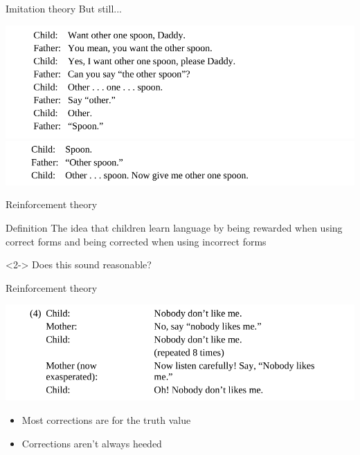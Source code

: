 \documentclass{beamer}
\begin{document}
        \begin{frame}{Imitation theory}
            But still... 
            \begin{example}
                \includegraphics[scale=0.45]{DirectTeaching.PNG}\\
                \includegraphics[scale=0.445]{DirectTeaching2.PNG}
            \end{example}
        \end{frame}
        \begin{frame}{Reinforcement theory}
            \begin{block}{Definition}
                The idea that children learn language by being rewarded when using correct forms and being corrected when using incorrect forms
            \end{block}
            \begin{alertblock}<2->{}
                Does this sound reasonable?
            \end{alertblock}
        \end{frame}
        \begin{frame}{Reinforcement theory}
            \begin{example}
                \includegraphics[scale=0.45]{Correcting.PNG}
            \end{example}
            \begin{itemize}
                \item<2-> Most corrections are for the truth value
                \item<2-> Corrections aren't always heeded
            \end{itemize}
        \end{frame}
\end{document}
